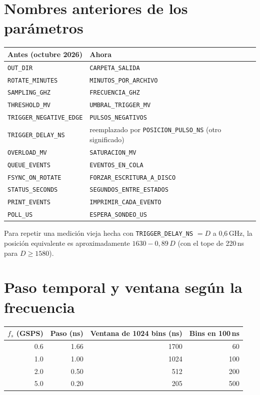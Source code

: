 \documentclass[11pt,a4paper]{article}
\newcommand{\code}[1]{\texttt{#1}}
\begin{document}
\section{Nombres anteriores de los parámetros}

\begin{center}
\small
\begin{tabular}{ll}
\toprule
Antes (octubre 2026) & Ahora \\
\midrule
\code{OUT\_DIR} & \code{CARPETA\_SALIDA} \\
\code{ROTATE\_MINUTES} & \code{MINUTOS\_POR\_ARCHIVO} \\
\code{SAMPLING\_GHZ} & \code{FRECUENCIA\_GHZ} \\
\code{THRESHOLD\_MV} & \code{UMBRAL\_TRIGGER\_MV} \\
\code{TRIGGER\_NEGATIVE\_EDGE} & \code{PULSOS\_NEGATIVOS} \\
\code{TRIGGER\_DELAY\_NS} & reemplazado por \code{POSICION\_PULSO\_NS} (otro significado) \\
\code{OVERLOAD\_MV} & \code{SATURACION\_MV} \\
\code{QUEUE\_EVENTS} & \code{EVENTOS\_EN\_COLA} \\
\code{FSYNC\_ON\_ROTATE} & \code{FORZAR\_ESCRITURA\_A\_DISCO} \\
\code{STATUS\_SECONDS} & \code{SEGUNDOS\_ENTRE\_ESTADOS} \\
\code{PRINT\_EVENTS} & \code{IMPRIMIR\_CADA\_EVENTO} \\
\code{POLL\_US} & \code{ESPERA\_SONDEO\_US} \\
\bottomrule
\end{tabular}
\end{center}

Para repetir una medición vieja hecha con \code{TRIGGER\_DELAY\_NS} $= D$ a
0{,}6\,GHz, la posición equivalente es aproximadamente $1630 - 0{,}89\,D$ (con el
tope de 220\,ns para $D \geq 1580$).

\section{Paso temporal y ventana según la frecuencia}

\begin{center}
\begin{tabular}{rrrr}
\toprule
$f_s$ (GSPS) & Paso (ns) & Ventana de 1024 bins (ns) & Bins en 100\,ns \\
\midrule
0.6 & 1.66 & 1700 & 60 \\
1.0 & 1.00 & 1024 & 100 \\
2.0 & 0.50 & 512 & 200 \\
5.0 & 0.20 & 205 & 500 \\
\bottomrule
\end{tabular}
\end{center}
\end{document}
